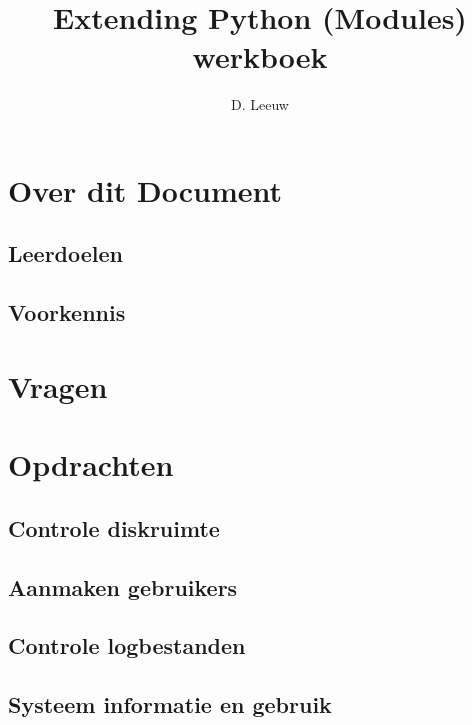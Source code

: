 \documentclass[a4paper,12pt,twoside,openright,titlepage]{article}
\author{D. Leeuw}
\title{Extending Python (Modules) werkboek}
\date{\today\\
1.0.0\\
\vfill
\raggedright
\copyright\ 2025 Dennis Leeuw\\
}
\begin{document}

\maketitle


\section{Over dit Document}
\subsection{Leerdoelen}

\subsection{Voorkennis}




\section{Vragen}

\section{Opdrachten}
\subsection{Controle diskruimte}

\subsection{Aanmaken gebruikers}

\subsection{Controle logbestanden}

\subsection{Systeem informatie en gebruik}


\printindex
\end{document}
